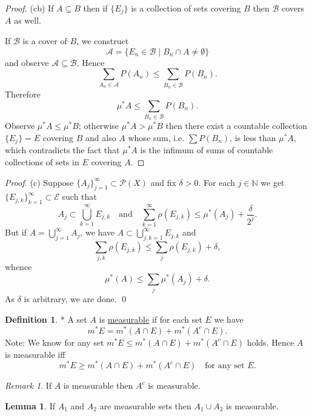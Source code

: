 \documentclass[11pt]{article}
\theoremstyle{definition}
\newtheorem{definition}{Definition}[section]
\newtheorem{lemma}{Lemma}[section]
\theoremstyle{remark}
\newtheorem{remark}{Remark}[section]
\begin{document}
\begin{proof}
(cb) If $A \subseteq B$ then if $\{E_j\}$ is a collection of sets covering $B$ then $\mathcal{B}$ covers $A$ as well.

If $\mathcal{B}$ is a cover of $B$, we construct
\[
\mathcal{A} = \{E_n \in \mathcal{B} \mid B_n \cap A \neq \emptyset\}
\]
and observe $\mathcal{A} \subseteq \mathcal{B}$. Hence
\[
\sum_{A_n \in \mathcal{A}} P(A_n) \leq \sum_{B_n \in \mathcal{B}} P(B_n).
\]
Therefore
\[
\mu^* A \leq \sum_{B_n \in \mathcal{B}} P(B_n).
\]
Observe $\mu^* A \leq \mu^* B$; otherwise $\mu^* A > \mu^* B$ then there exist a countable collection $\{E_j\} = E$ covering $B$ and also $A$ whose sum, i.e. $\sum P(B_n)$, is less than $\mu^* A$, which contradicts the fact that $\mu^* A$ is the infimum of sums of countable collections of sets in $E$ covering $A$.
\end{proof}

\begin{proof}
(c) Suppose $\{A_j\}_{j=1}^\infty \subset \mathcal{P}(X)$ and fix $\delta > 0$.
For each $j \in \mathbb{N}$ we get $\{E_{j,k}\}_{k=1}^\infty \subset \mathcal{E}$ such that
\[
A_j \subset \bigcup_{k=1}^\infty E_{j,k} \quad \text{and} \quad \sum_{k=1}^\infty \rho(E_{j,k}) \leq \mu^*(A_j) + \frac{\delta}{2^j}.
\]
But if $A = \bigcup_{j=1}^\infty A_j$, we have $A \subset \bigcup_{j,k=1}^\infty E_{j,k}$ and
\[
\sum_{j,k} \rho(E_{j,k}) \leq \sum_j \rho(E_{j,k}) + \delta,
\]
whence
\[
\mu^*(A) \leq \sum_j \mu^*(A_j) + \delta.
\]
As $\delta$ is arbitrary, we are done.
\qed
\end{proof}

\begin{definition}\label{def:measurable_set}
* A set $A$ is \underline{measurable} if for each set $E$ we have
\[
m^*E = m^*(A \cap E) + m^*(A^c \cap E).
\]
Note: We know for any set $m^*E \leq m^*(A \cap E) + m^*(A^c \cap E)$ holds. Hence $A$ is measurable iff
\[
m^*E \geq m^*(A \cap E) + m^*(A^c \cap E) \quad \text{for any set } E.
\]
\end{definition}

\begin{remark}\label{rem:complement_measurable}
If $A$ is measurable then $A^c$ is measurable.
\end{remark}

\begin{lemma}\label{lem:union_measurable}
If $A_1$ and $A_2$ are measurable sets then $A_1 \cup A_2$ is measurable.
\end{lemma}
\end{document}
